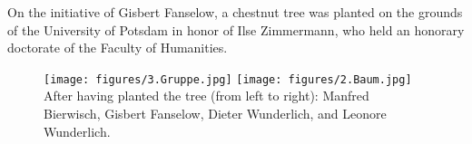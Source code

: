 

{}
\noindent 
On the initiative of Gisbert Fanselow, a chestnut tree was planted on the grounds of the University of Potsdam in honor of Ilse Zimmermann, who held an honorary doctorate of  the Faculty of Humanities.

\begin{figure}
    \hbox{}\hfill
    \texttt{[image: figures/3.Gruppe.jpg]}%
    \hfill%
    \texttt{[image: figures/2.Baum.jpg]}%
    \hfill\hbox{}\\
    {\small After having planted the tree (from left to right): Manfred Bierwisch, Gisbert Fanselow, Dieter Wunderlich, and Leonore Wunderlich.}
\end{figure}


